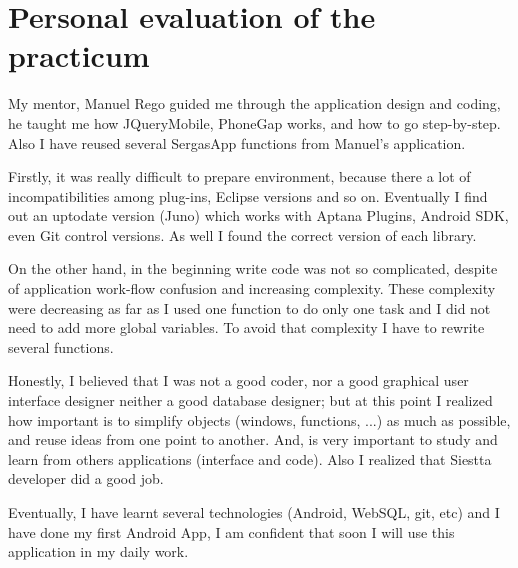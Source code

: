 \chapter{Personal evaluation of the practicum }

	My mentor, Manuel Rego guided me through the application design and coding, he taught me how JQueryMobile, PhoneGap works, and how to go 
	step-by-step. Also I have reused several SergasApp functions from Manuel's application. 
	
Firstly, it was really difficult to prepare environment, because there a lot of incompatibilities among plug-ins, Eclipse versions and so on.
Eventually I find out an uptodate version (Juno) which works with Aptana Plugins, Android SDK, even Git control versions. As well I found the correct version of each library. 

	On the other hand, in the beginning write code was not so complicated, despite of application work-flow confusion and increasing complexity. 	
	These complexity were decreasing as far as I used one function to do only one task and I did not need to add more global variables.
To avoid that complexity I have to rewrite several functions.

	Honestly, I believed that I was not a good coder, nor a good graphical user interface designer neither a good database designer; but
	at this point I realized how important is to simplify objects (windows, functions, ...) as much as possible, and reuse ideas from one point to another. And, 
	is very important to study and learn from others applications (interface and code). Also I realized that Siestta developer did a good job. 
	
	Eventually, I have learnt several technologies (Android, WebSQL, git, etc) and I have done my first Android App, I am confident that soon I will use 
this application in my daily work.
